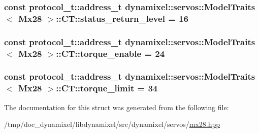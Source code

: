 \subsubsection[{\texorpdfstring{status\+\_\+return\+\_\+level}{status_return_level}}]{\setlength{\rightskip}{0pt plus 5cm}const {\bf protocol\+\_\+t\+::address\+\_\+t} {\bf dynamixel\+::servos\+::\+Model\+Traits}$<$ {\bf Mx28} $>$\+::C\+T\+::status\+\_\+return\+\_\+level = 16\hspace{0.3cm}{\ttfamily [static]}}\hypertarget{structdynamixel_1_1servos_1_1_model_traits_3_01_mx28_01_4_1_1_c_t_a6440b867d4ce245168f155bed633211e}{}\label{structdynamixel_1_1servos_1_1_model_traits_3_01_mx28_01_4_1_1_c_t_a6440b867d4ce245168f155bed633211e}
\subsubsection[{\texorpdfstring{torque\+\_\+enable}{torque_enable}}]{\setlength{\rightskip}{0pt plus 5cm}const {\bf protocol\+\_\+t\+::address\+\_\+t} {\bf dynamixel\+::servos\+::\+Model\+Traits}$<$ {\bf Mx28} $>$\+::C\+T\+::torque\+\_\+enable = 24\hspace{0.3cm}{\ttfamily [static]}}\hypertarget{structdynamixel_1_1servos_1_1_model_traits_3_01_mx28_01_4_1_1_c_t_a4aef6f10002851aee9ec792fd9b1744d}{}\label{structdynamixel_1_1servos_1_1_model_traits_3_01_mx28_01_4_1_1_c_t_a4aef6f10002851aee9ec792fd9b1744d}
\subsubsection[{\texorpdfstring{torque\+\_\+limit}{torque_limit}}]{\setlength{\rightskip}{0pt plus 5cm}const {\bf protocol\+\_\+t\+::address\+\_\+t} {\bf dynamixel\+::servos\+::\+Model\+Traits}$<$ {\bf Mx28} $>$\+::C\+T\+::torque\+\_\+limit = 34\hspace{0.3cm}{\ttfamily [static]}}\hypertarget{structdynamixel_1_1servos_1_1_model_traits_3_01_mx28_01_4_1_1_c_t_aea2d3c35d6d70ec41e6e1e1bf32534df}{}\label{structdynamixel_1_1servos_1_1_model_traits_3_01_mx28_01_4_1_1_c_t_aea2d3c35d6d70ec41e6e1e1bf32534df}


The documentation for this struct was generated from the following file\+:\begin{DoxyCompactItemize}
\item 
/tmp/doc\+\_\+dynamixel/libdynamixel/src/dynamixel/servos/\hyperlink{mx28_8hpp}{mx28.\+hpp}\end{DoxyCompactItemize}
